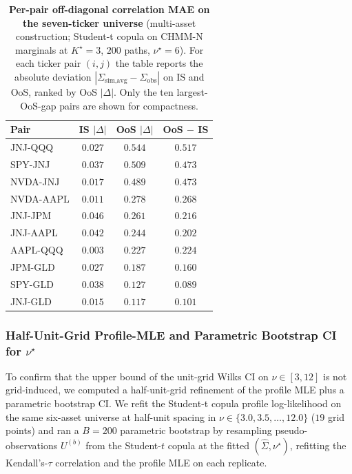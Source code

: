 \begin{table}[t]
\centering
\small
\caption{\textbf{Per-pair off-diagonal correlation MAE on the seven-ticker universe} (multi-asset construction; Student-t copula on CHMM-N marginals at $K^\star = 3$, $200$ paths, $\nu^\star = 6$). For each ticker pair $(i, j)$ the table reports the absolute deviation $|\Sigma_{\text{sim,avg}} - \Sigma_{\text{obs}}|$ on IS and OoS, ranked by OoS $|\Delta|$. Only the ten largest-OoS-gap pairs are shown for compactness.}
\label{tab:per_pair_offdiag_mae}
\begin{tabular}{l c c c}
\toprule
Pair & IS $|\Delta|$ & OoS $|\Delta|$ & OoS $-$ IS \\
\midrule
JNJ-QQQ   & $0.027$ & $0.544$ & $0.517$ \\
SPY-JNJ   & $0.037$ & $0.509$ & $0.473$ \\
NVDA-JNJ  & $0.017$ & $0.489$ & $0.473$ \\
NVDA-AAPL & $0.011$ & $0.278$ & $0.268$ \\
JNJ-JPM   & $0.046$ & $0.261$ & $0.216$ \\
JNJ-AAPL  & $0.042$ & $0.244$ & $0.202$ \\
AAPL-QQQ  & $0.003$ & $0.227$ & $0.224$ \\
JPM-GLD   & $0.027$ & $0.187$ & $0.160$ \\
SPY-GLD   & $0.038$ & $0.127$ & $0.089$ \\
JNJ-GLD   & $0.015$ & $0.117$ & $0.101$ \\
\bottomrule
\end{tabular}
\end{table}



\subsubsection{\texorpdfstring{Half-Unit-Grid Profile-MLE and Parametric Bootstrap CI for $\nu^\star$}{Half-Unit-Grid Profile-MLE and Parametric Bootstrap CI for nu*}}
\label{sec:copula_halfunit}

To confirm that the upper bound of the unit-grid Wilks CI on $\nu \in [3, 12]$ is not grid-induced, we computed a half-unit-grid refinement of the profile MLE plus a parametric bootstrap CI. We refit the Student-t copula profile log-likelihood on the same six-asset universe at half-unit spacing in $\nu \in \{3.0, 3.5, \ldots, 12.0\}$ ($19$ grid points) and ran a $B = 200$ parametric bootstrap by resampling pseudo-observations $U^{(b)}$ from the Student-$t$ copula at the fitted $(\hat{\Sigma}, \nu^\star)$, refitting the Kendall's-$\tau$ correlation and the profile MLE on each replicate.

